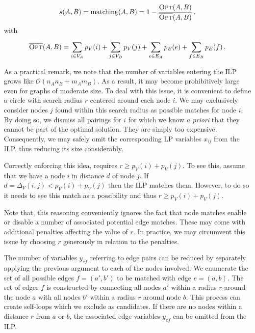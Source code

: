		\begin{equation}
		s(A,B) = \text{matching}(A,B) = 1 - \frac{\textsc{Opt}(A,B)}{\overline{\textsc{Opt}}(A,B)}\,,
		\end{equation}
		with

		\begin{equation}
		\overline{\textsc{Opt}}(A,B) =   \sum_{ \substack{i \in V_A }} p_{V}(i) + \sum_{ \substack{j \in V_B}} p_{V}(j)  + \sum_{ \substack{e \in E_A }} p_{E}(e) + \sum_{ \substack{f \in E_B}} p_{E}(f)\,.
		\end{equation}


		As a practical remark, we note that the number of variables entering the ILP grows like $\mathcal{O}(n_A n_B + m_A m_B)$. As a result, it may become prohibitively large even for graphs of moderate size. To deal with this issue, it is convenient to define a circle with search radius $r$ centered around each node $i$. We may exclusively consider nodes $j$ found within this search radius as possible matches for node $i$. By doing so, we dismiss all pairings for $i$ for which we know \emph{a priori} that they cannot be part of the optimal solution. They are simply too expensive. Consequently, we may safely omit the corresponding LP variables $x_{ij}$ from the ILP, thus reducing its size considerably. 

		Correctly enforcing this idea, requires $r \ge  p_{V}(i) + p_{V}(j)$. To see this, assume that we have a node $i$ in distance $d$ of node $j$. If $d = \Delta_{V}(i,j) < p_{V}(i) + p_{V}(j)$ then the ILP matches them. However, to do so it needs to see this match as a possibility and thus $r \ge  p_{V}(i) + p_{V}(j)$.

		Note that, this reasoning conveniently ignores the fact that node matches enable or disable a number of associated potential edge matches. These may come with additional penalties affecting the value of $r$. In practice, we may circumvent this issue by choosing $r$ generously in relation to the penalties. 


		The number of variables $y_{ef}$ referring to edge pairs can be reduced by separately applying the previous argument to each of the nodes involved. We enumerate the set of all possible edges $f = (a',b')$ to be matched with edge $e = (a,b)$. The set of edges $f$ is constructed by connecting all nodes $a'$ within a radius $r$ around the node $a$ with all nodes $b'$ within a radius $r$ around node $b$. This process can create self-loops which we exclude as candidates. If there are no nodes within a distance $r$ from $a$ or $b$, the associated edge variables $y_{ef}$ can be omitted from the ILP. 

